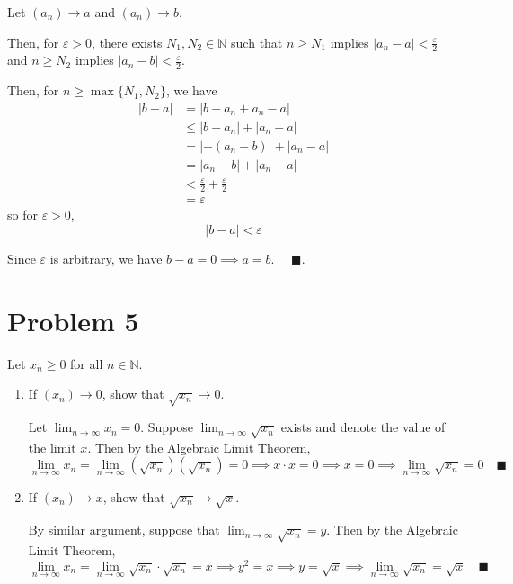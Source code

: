 \documentclass[11pt]{article}
\numberwithin{equation}{section}
\theoremstyle{definition}
\theoremstyle{remark}
\newcommand{\ep}{\varepsilon}
\newcommand{\N}{\mathbb{N}}
\renewcommand{\qed}{\quad \blacksquare}
\newcommand{\abs}[1]{\left\vert #1 \right\vert}
\begin{document}
    \color{blue}
        Let $(a_n) \to a$ and $(a_n) \to b$.         
        
        Then, for $\varepsilon > 0$, there exists $N_1, N_2 \in \N$ such that $n \geq N_1$ implies $\abs{a_n - a} < \frac{\varepsilon}{2}$ and $n \geq N_2$ implies $\abs{a_n - b} < \frac{\ep}{2}$. 

        Then, for $n \geq \max\{N_1, N_2\}$, we have
        \begin{align*}
            \abs{b - a} &= \abs{b - a_n + a_n - a} \\ 
                &\leq \abs{b - a_n} + \abs{a_n - a}\\ 
                &= \abs{-(a_n - b)} + \abs{a_n - a}\\ 
                &= \abs{a_n - b} + \abs{a_n - a}\\ 
                &< \frac{\varepsilon}{2} + \frac{\varepsilon}{2}\\ 
                &= \varepsilon
        \end{align*}
        so for $\ep > 0$,
        \[\abs{b- a} < \varepsilon\]

        Since $\ep$ is arbitrary, we have $b - a = 0 \implies a = b$. $\qed$. 
        
    \color{black}


\pagebreak
\section*{Problem 5}
Let $x_n \geq 0$ for all $n \in \mathbb{N}$.
\begin{enumerate}
	\item If $(x_n)\to0$, show that $\sqrt{x_n}\to0$.
    
        \color{blue}
            Let $\lim_{n\to \infty} x_n = 0$. Suppose $\lim_{n\to \infty} \sqrt{x_n}$ exists and denote the value of the limit $x$. Then by the Algebraic Limit Theorem, 
            \[\lim_{n\to \infty} x_n = \lim_{n\to \infty} (\sqrt{x_n})(\sqrt{x_n}) = 0 \implies x\cdot x = 0 \implies x = 0 \implies \lim_{n\to \infty} \sqrt{x_n} = 0 \qed\]
        \color{black}

	\item If $(x_n) \to x$, show that $\sqrt{x_n} \to \sqrt{x}$.
	
        \color{blue}
            By similar argument, suppose that $\lim_{n\to \infty} \sqrt{x_n} = y$. Then by the Algebraic Limit Theorem,
            \[\lim_{n\to \infty} x_n = \lim_{n\to \infty} \sqrt{x_n}\cdot \sqrt{x_n} = x \implies y^2 = x \implies y = \sqrt{x} \implies \lim_{n\to\infty} \sqrt{x_n} = \sqrt{x} \qed\]
        \color{black}
\end{enumerate}
\end{document}
